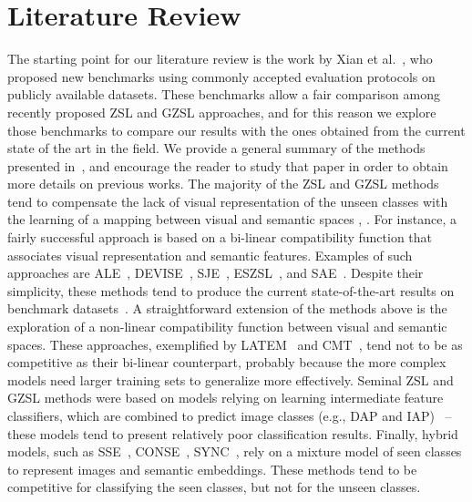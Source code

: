 \documentclass[runningheads]{llncs}
\begin{document}
%
%
%
%
%
%
%



\section{Literature Review}
\label{sec:lit_review}

The starting point for our literature review is the work by Xian et al.~\cite{XianCVPR2017,XianCVPR2018}, who proposed new benchmarks using commonly accepted evaluation protocols on publicly available datasets.  These benchmarks allow a fair comparison among recently proposed ZSL and GZSL approaches, and for this reason we explore those benchmarks to compare our results with the ones obtained from the current state of the art in the field.  We provide a general summary of the methods presented in~\cite{XianCVPR2017}, and encourage the reader to study that paper in order to obtain more details on previous works.  
The majority of the ZSL and GZSL methods tend to compensate the lack of visual representation of the unseen classes with the learning of a mapping between visual and semantic spaces \cite{chen2018preserving}, \cite{annadani2018relations}.
For instance, a fairly successful approach is based on a bi-linear compatibility function that associates visual representation and semantic features.  Examples of such approaches are ALE~\cite{akata2016label}, DEVISE~\cite{frome2013devise},  SJE~\cite{akata2015evaluation}, ESZSL~\cite{romera2015embarrassingly}, and SAE~\cite{kodirov2017semantic}.  Despite their simplicity, these methods tend to produce the current state-of-the-art results on benchmark datasets~\cite{XianCVPR2017}.  A straightforward extension of the methods above is the exploration of a non-linear compatibility function between visual and semantic spaces.  These approaches, exemplified by LATEM~\cite{xian2016latent} and CMT~\cite{socher2013zero}, tend not to be as competitive as their bi-linear counterpart, probably because the more complex models need larger training sets to generalize more effectively.
Seminal ZSL and GZSL methods were based on models relying on learning intermediate feature classifiers, which are combined to predict image classes (e.g., DAP and IAP)~\cite{lampert2014attribute} -- these models tend to present relatively poor classification results.
Finally, hybrid models, such as SSE~\cite{zhang2015zero}, CONSE~\cite{norouzi2013zero}, SYNC~\cite{changpinyo2016synthesized}, rely on a mixture model of seen classes to represent images and semantic embeddings.  These methods tend to be competitive for classifying the seen classes, but not for the unseen classes.
\end{document}
